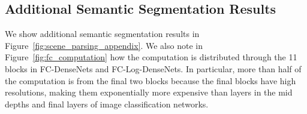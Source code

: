 \documentclass{article}
\newcommand{\logdense}{Log-DenseNet\xspace}
\newcommand{\logdenses}{Log-DenseNets\xspace}
\begin{document}


%



\subsection{Additional Semantic Segmentation Results}
\label{sec:additional_scene_parsing}
We show additional semantic segmentation results in Figure~\ref{fig:scene_parsing_appendix}. We also note in Figure~\ref{fig:fc_computation} how the computation is distributed through the 11 blocks in FC-DenseNets and FC-\logdenses. In particular, more than half of the computation is from the final two blocks because the final blocks have high resolutions, making them exponentially more expensive than layers in the mid depths and final layers of image classification networks. 
\end{document}
